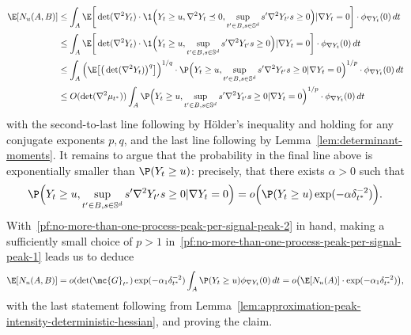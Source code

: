 \documentclass{article}
\begin{document}
	\begin{align}
		\E[N_{u}(A,B)] 
		& 
		\leq \int_{A} \E\bigg[\det(\nabla^2 Y_t) \cdot \1\Big(Y_t \geq u, \nabla^2 Y_t \preceq 0, \sup_{t' \in B, s \in \mathbb{S}^{d}} s' \nabla^2 Y_{t'} s \geq 0\Big)|\nabla Y_t = 0\bigg] \cdot \phi_{\nabla Y_t}(0) \,dt \nonumber \\
		& 
		\leq \int_{A} \E\bigg[\det(\nabla^2 Y_t) \cdot \1\Big(Y_t \geq u, \sup_{t' \in B, s \in \mathbb{S}^{d}} s' \nabla^2 Y_{t'} s \geq 0\Big)|\nabla Y_t = 0\bigg] \cdot \phi_{\nabla Y_t}(0) \,dt \nonumber \\
		& 
		\leq \int_{A} \Big(\E\big[\big(\det(\nabla^2 Y_t)\big)^q\big]\Big)^{1/q} \cdot \P\Big(Y_t \geq u, \sup_{t' \in B, s \in \mathbb{S}^{d}} s' \nabla^2 Y_{t'} s \geq 0|\nabla Y_t = 0\Big)^{1/p} \cdot \phi_{\nabla Y_t}(0) \,dt \nonumber \\
		& \leq
		O(\det(\nabla^2 \mu_{t^*})) \int_{A} \P\Big(Y_t \geq u, \sup_{t' \in B, s \in \mathbb{S}^{d}} s' \nabla^2 Y_{t'} s \geq 0|\nabla Y_t = 0\Big)^{1/p} \cdot \phi_{\nabla Y_t}(0) \,dt \label{pf:no-more-than-one-process-peak-per-signal-peak-1}
	\end{align}
	with the second-to-last line following by H\"{o}lder's inequality and holding for any conjugate exponents $p,q$, and the last line following by Lemma~\ref{lem:determinant-moments}. It remains to argue that the probability in the final line above is exponentially smaller than $\P(Y_t \geq u)$: precisely, that there exists $\alpha > 0$ such that
	\begin{equation}
		\label{pf:no-more-than-one-process-peak-per-signal-peak-2}
		\P\Big(Y_t \geq u, \sup_{t' \in B, s \in \mathbb{S}^{d}} s' \nabla^2 Y_{t'} s \geq 0|\nabla Y_t = 0\Big) = o\Big(\P(Y_t \geq u) \exp(-\alpha \delta_{t^{\ast}}^{-2})\Big).
	\end{equation}
	With~\eqref{pf:no-more-than-one-process-peak-per-signal-peak-2} in hand, making a sufficiently small choice of $p > 1$ in~\eqref{pf:no-more-than-one-process-peak-per-signal-peak-1} leads us to deduce 
	\begin{equation*}
		\E[N_{u}(A,B)] = o(\det(\mc{G}_{t^{\ast}}) \exp(-\alpha_1 \delta_{t^{\ast}}^{-2}) \int_{A} \P(Y_t \geq u) \phi_{\nabla Y_t}(0) \,dt = o\big(\E[N_{u}(A)] \cdot \exp(-\alpha_1 \delta_{t^{\ast}}^{-2})\big),
	\end{equation*}
	with the last statement following from Lemma~\ref{lem:approximation-peak-intensity-deterministic-hessian}, and proving the claim. 
	
\end{document}
